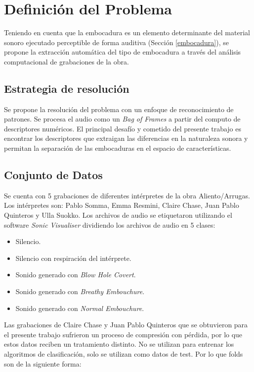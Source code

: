 \documentclass{article}
\begin{document}
\newpage

\section{Definición del Problema}
\label{problema}
Teniendo en cuenta que la embocadura es un elemento determinante del material sonoro ejecutado perceptible de forma auditiva (Sección \ref{embocadura}), se propone la extracción automática del tipo de embocadura a través del análisis computacional de grabaciones de la obra. 


\subsection{Estrategia de resolución}

Se propone la resolución del problema con un enfoque de reconocimiento de patrones. Se procesa el audio como un \textit{Bag of Frames} a partir del computo de descriptores numéricos. El principal desafío y cometido del presente trabajo es encontrar los descriptores que extraigan las diferencias en la naturaleza sonora y permitan la separación de las embocaduras en el espacio de características. 
\medskip

\subsection{Conjunto de Datos}
\label{datos}
Se cuenta con 5 grabaciones de diferentes intérpretes de la obra Aliento/Arrugas. Los intérpretes son: Pablo Somma, Emma Resmini, Claire Chase, Juan Pablo Quinteros y Ulla Suokko. Los archivos de audio se etiquetaron utilizando el software \textit{Sonic Visualiser} \citep{cannam2010sonic} dividiendo los archivos de audio en 5 clases:

\begin{itemize} 
  \item Silencio.
  \item Silencio con respiración del intérprete. 
  \item Sonido generado con \textit{Blow Hole Covert}.
  \item Sonido generado con \textit{Breathy Embouchure}.
  \item Sonido generado con \textit{Normal Embouchure}.
\end{itemize}

Las grabaciones de Claire Chase y Juan Pablo Quinteros que se obtuvieron para el presente trabajo sufrieron un proceso de compresión con pérdida, por lo que estos datos reciben un tratamiento distinto. No se utilizan para entrenar los algoritmos de clasificación, solo se utilizan como datos de test. Por lo que folds son de la siguiente forma: 
\end{document}
